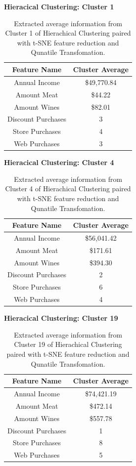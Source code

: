 \documentclass[twocolumn]{article}
\begin{document}
\begin{table}
    \centering
    \textbf{Hieracical Clustering: Cluster 1}
        \begin{tabular}{|c|c|}
            \hline
            \textbf{Feature Name} & \textbf{Cluster Average} \\
            \hline
            Annual Income & \$49,770.84 \\
            Amount Meat & \$44.22 \\
            Amount Wines & \$82.01 \\
            Discount Purchases & 3 \\
            Store Purchases & 4 \\
            Web Purchases & 3 \\
            \hline
        \end{tabular}
    \caption{Extracted average information from Cluster 1 of Hierachical Clustering paired with t-SNE feature reduction and Qunatile Transfomation.}
\end{table}

\begin{table}
    \centering
    \textbf{Hieracical Clustering: Cluster 4}
        \begin{tabular}{|c|c|}
            \hline
            \textbf{Feature Name} & \textbf{Cluster Average} \\
            \hline
            Annual Income & \$56,041.42 \\
            Amount Meat & \$171.61 \\
            Amount Wines & \$394.30 \\
            Discount Purchases & 2 \\
            Store Purchases & 6 \\
            Web Purchases & 4 \\
            \hline
        \end{tabular}
    \caption{Extracted average information from Cluster 4 of Hierachical Clustering paired with t-SNE feature reduction and Qunatile Transfomation.}
\end{table}

\begin{table}
    \centering
    \textbf{Hieracical Clustering: Cluster 19}
        \begin{tabular}{|c|c|}
            \hline
            \textbf{Feature Name} & \textbf{Cluster Average} \\
            \hline
            Annual Income & \$74,421.19 \\
            Amount Meat & \$472.14 \\
            Amount Wines & \$557.78 \\
            Discount Purchases & 1 \\
            Store Purchases & 8 \\
            Web Purchases & 5 \\
            \hline
        \end{tabular}
    \caption{Extracted average information from Cluster 19 of Hierachical Clustering paired with t-SNE feature reduction and Qunatile Transfomation.}
\end{table}
\end{document}
